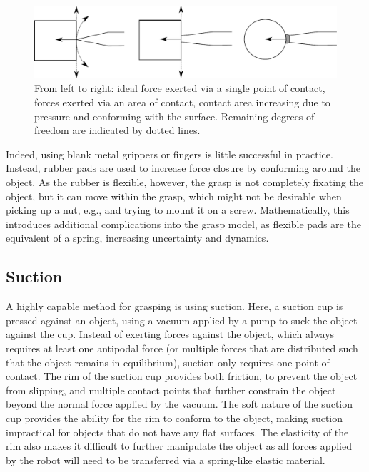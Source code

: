 \begin{figure}
\includegraphics[width=\columnwidth]{figs/graspingcontacts}
\caption{From left to right: ideal force exerted via a single point of contact, forces exerted via an area of contact, contact area increasing due to pressure and conforming with the surface. Remaining degrees of freedom are indicated by dotted lines.\label{fig:contactarea}}
\end{figure}

Indeed, using blank metal grippers or fingers is little successful in practice. Instead, rubber pads are used to increase force closure by conforming around the object. As the rubber is flexible, however, the grasp is not completely fixating the object, but it can move within the grasp, which might not be desirable when picking up a nut, e.g., and trying to mount it on a screw. Mathematically, this introduces additional complications into the grasp model, as flexible pads are the equivalent of a spring, increasing uncertainty and dynamics. 

\subsection{Suction}

A highly capable method for grasping is using suction. Here, a suction cup is pressed against an object, using a vacuum applied by a pump to suck the object against the cup. Instead of exerting forces against the object, which always requires at least one antipodal force (or multiple forces that are distributed such that the object remains in equilibrium), suction only requires one point of contact. The rim of the suction cup provides both friction, to prevent the object from slipping, and multiple contact points that further constrain the object beyond the normal force applied by the vacuum. The soft nature of the suction cup provides the ability for the rim to conform to the object, making suction impractical for objects that do not have any flat surfaces. The elasticity of the rim also makes it difficult to further manipulate the object as all forces applied by the robot will need to be transferred via a spring-like elastic material.

